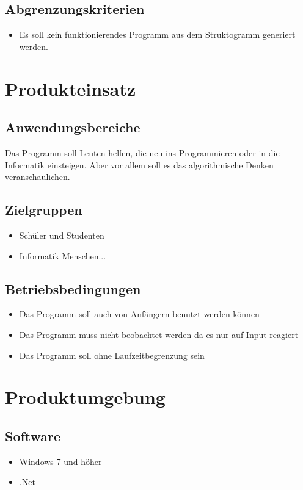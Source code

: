 \documentclass[a4paper,10pt]{report}
\begin{document}
\subsection{Abgrenzungskriterien}
\begin{itemize}
\item Es soll kein funktionierendes Programm aus dem Struktogramm generiert werden.
\end{itemize}

\section{Produkteinsatz}
\subsection{Anwendungsbereiche}
Das Programm soll Leuten helfen, die neu ins Programmieren oder in die Informatik einsteigen. Aber vor allem soll es das algorithmische Denken veranschaulichen.
\subsection{Zielgruppen}
\begin{itemize}
\item Schüler und Studenten
\item Informatik Menschen...
\end{itemize}
\subsection{Betriebsbedingungen}
\begin{itemize}
\item Das Programm soll auch von Anfängern benutzt werden können
\item Das Programm muss nicht beobachtet werden da es nur auf Input reagiert
\item Das Programm soll ohne Laufzeitbegrenzung sein
\end{itemize}
\section{Produktumgebung}
\subsection{Software}
\begin{itemize}
\item Windows 7 und höher
\item .Net
\end{itemize}
\end{document}
